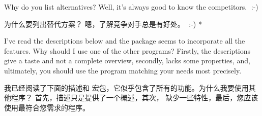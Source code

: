 \begin{advise}
\begin{paracol}{2}
\item Why do you list alternatives?
      \advisespace
      Well, it's always good to know the competitors.^^A :-)
\switchcolumn
\item 为什么要列出替代方案？
\advisespace
嗯，了解竞争对手总是有好处。^^A :-)
\switchcolumn[0]*%
\item I've read the descriptions below and the  package
      seems to incorporate all the features. Why should I use one of the
      other programs?
      \advisespace
      Firstly, the descriptions give a taste and not a complete overview,
      secondly,  lacks some properties, and, ultimately,
      you should use the program matching your needs most precisely.
\switchcolumn
\item 我已经阅读了下面的描述和  宏包，它似乎包含了所有的功能。为什么我要使用其他程序？
\advisespace
首先，描述只是提供了一个概述，其次， 缺少一些特性，最后，您应该使用最符合您需求的程序。
\end{paracol}
\end{advise}

